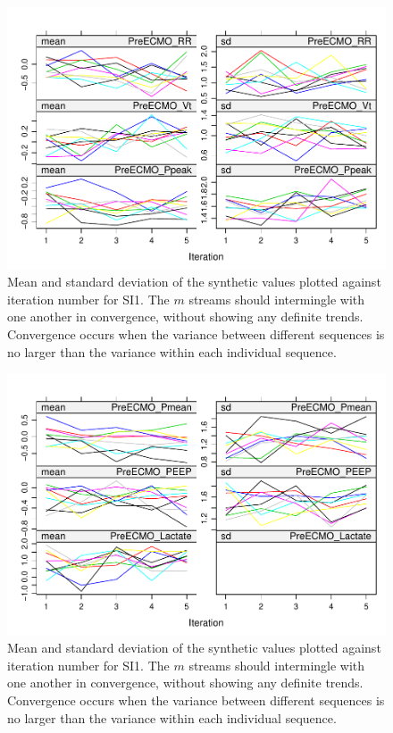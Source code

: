 \documentclass[12pt,]{article}
\begin{document}
\begin{figure}[H]

{\centering \includegraphics[width=0.75\linewidth]{figure/graphics-unnamed-chunk-16-1} 

}

\caption{\label{fig:converge-mean}Mean and standard deviation of the synthetic values plotted against iteration number for SI1.  The $m$ streams should intermingle with one another in convergence, without showing any definite trends.  Convergence occurs when the variance between different sequences is no larger than the variance within each individual sequence.}\label{fig:unnamed-chunk-161}
\end{figure}\begin{figure}[H]

{\centering \includegraphics[width=0.75\linewidth]{figure/graphics-unnamed-chunk-16-2} 

}

\caption{\label{fig:converge-mean}Mean and standard deviation of the synthetic values plotted against iteration number for SI1.  The $m$ streams should intermingle with one another in convergence, without showing any definite trends.  Convergence occurs when the variance between different sequences is no larger than the variance within each individual sequence.}\label{fig:unnamed-chunk-162}
\end{figure}\begin{figure}[H]


\end{figure}
\end{document}
